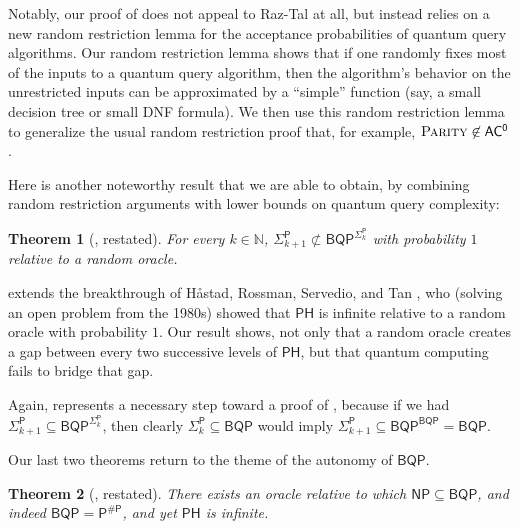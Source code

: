 \documentclass[10pt,a4paper]{article}
\newtheorem{theorem}{Theorem}
\newcommand{\Naturals}{\mathbb{N}}
\newcommand{\PARITY}{\normalfont\textsc{Parity}}
\begin{document}
Notably, our proof of  does not appeal to Raz-Tal at all, but instead relies on a new random restriction lemma for the acceptance probabilities of quantum query algorithms. Our random restriction lemma shows that if one randomly fixes most of the inputs to a quantum query algorithm, then the algorithm's behavior on the unrestricted inputs can be approximated by a ``simple'' function (say, a small decision tree or small DNF formula). We then use this random restriction lemma to generalize the usual random restriction proof that, for example, $\PARITY \not\in \mathsf{AC^0}$ \cite{Has87}.

\bigskip

Here is another noteworthy result that we are able to obtain, by
combining random restriction arguments with lower bounds on quantum query complexity:

\begin{theorem}[, restated]
\label{thm:bqp_sigma_k_intro}
For every $k \in \Naturals$, $\mathsf{\Sigma}_{k+1}^\mathsf{P} \not\subset \mathsf{BQP}^{\mathsf{\Sigma}_{k}^\mathsf{P}}$ with probability $1$ relative to a random oracle.
\end{theorem}

 extends the breakthrough of H\r{a}stad, Rossman, Servedio, and Tan \cite{HRST17}, who (solving an open problem from the 1980s) showed that $\mathsf{PH}$ is infinite relative to a random oracle with probability $1$.  Our result shows, not only that a random oracle creates a gap between every two successive levels of $\mathsf{PH}$, but that quantum computing fails to bridge that gap.

Again,  represents a necessary step toward a proof of , because if we had $\mathsf{\Sigma}_{k+1}^\mathsf{P} \subseteq \mathsf{BQP}^{\mathsf{\Sigma}_{k}^\mathsf{P}}$, then clearly $\mathsf{\Sigma}_k^\mathsf{P} \subseteq \mathsf{BQP}$ would imply $\mathsf{\Sigma}_{k+1}^\mathsf{P} \subseteq \mathsf{BQP}^\mathsf{BQP} = \mathsf{BQP}$.

\bigskip

Our last two theorems return to the theme of the autonomy of $\mathsf{BQP}$.

\begin{theorem}[, restated]
\label{thm:np_in_bqp_ph_infinite_intro}
There exists an oracle relative to which $\mathsf{NP} \subseteq \mathsf{BQP}$, and indeed $\mathsf{BQP} = \mathsf{P^{\# P}}$, and yet $\mathsf{PH}$ is infinite.
\end{theorem}
\end{document}
